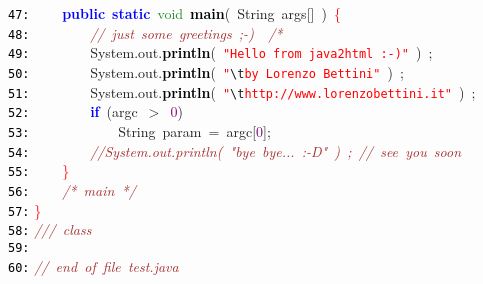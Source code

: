 \documentclass{article}
\begin{document}
\mbox{}\texttt{\textcolor{Black}{47:}} \ \ \ \ \textbf{\textcolor{Blue}{public}}\ \textbf{\textcolor{Blue}{static}}\ \textcolor{ForestGreen}{void}\ \textbf{\textcolor{Black}{main}}\textcolor{BrickRed}{(}\ \textcolor{TealBlue}{String}\ args\textcolor{BrickRed}{[]}\ \textcolor{BrickRed}{)}\ \textcolor{Red}{\{} \\
\mbox{}\texttt{\textcolor{Black}{48:}} \ \ \ \ \ \ \ \ \textit{\textcolor{Brown}{//\ just\ some\ greetings\ ;-)\ \ /*}} \\
\mbox{}\texttt{\textcolor{Black}{49:}} \ \ \ \ \ \ \ \ System\textcolor{BrickRed}{.}out\textcolor{BrickRed}{.}\textbf{\textcolor{Black}{println}}\textcolor{BrickRed}{(}\ \texttt{\textcolor{Red}{"{}Hello\ from\ java2html\ :-)"{}}}\ \textcolor{BrickRed}{)}\ \textcolor{BrickRed}{;} \\
\mbox{}\texttt{\textcolor{Black}{50:}} \ \ \ \ \ \ \ \ System\textcolor{BrickRed}{.}out\textcolor{BrickRed}{.}\textbf{\textcolor{Black}{println}}\textcolor{BrickRed}{(}\ \texttt{\textcolor{Red}{"{}}}\texttt{\textcolor{CarnationPink}{\textbackslash{}t}}\texttt{\textcolor{Red}{by\ Lorenzo\ Bettini"{}}}\ \textcolor{BrickRed}{)}\ \textcolor{BrickRed}{;} \\
\mbox{}\texttt{\textcolor{Black}{51:}} \ \ \ \ \ \ \ \ System\textcolor{BrickRed}{.}out\textcolor{BrickRed}{.}\textbf{\textcolor{Black}{println}}\textcolor{BrickRed}{(}\ \texttt{\textcolor{Red}{"{}}}\texttt{\textcolor{CarnationPink}{\textbackslash{}t}}\texttt{\textcolor{Red}{http://www.lorenzobettini.it"{}}}\ \textcolor{BrickRed}{)}\ \textcolor{BrickRed}{;} \\
\mbox{}\texttt{\textcolor{Black}{52:}} \ \ \ \ \ \ \ \ \textbf{\textcolor{Blue}{if}}\ \textcolor{BrickRed}{(}argc\ \textcolor{BrickRed}{$>$}\ \textcolor{Purple}{0}\textcolor{BrickRed}{)} \\
\mbox{}\texttt{\textcolor{Black}{53:}} \ \ \ \ \ \ \ \ \ \ \ \ \textcolor{TealBlue}{String}\ param\ \textcolor{BrickRed}{=}\ argc\textcolor{BrickRed}{[}\textcolor{Purple}{0}\textcolor{BrickRed}{];} \\
\mbox{}\texttt{\textcolor{Black}{54:}} \ \ \ \ \ \ \ \ \textit{\textcolor{Brown}{//System.out.println(\ "{}bye\ bye...\ :-D"{}\ )\ ;\ //\ see\ you\ soon}} \\
\mbox{}\texttt{\textcolor{Black}{55:}} \ \ \ \ \textcolor{Red}{\}} \\
\mbox{}\texttt{\textcolor{Black}{56:}} \ \ \ \ \textit{\textcolor{Brown}{/*\ main\ */}} \\
\mbox{}\texttt{\textcolor{Black}{57:}} \textcolor{Red}{\}} \\
\mbox{}\texttt{\textcolor{Black}{58:}} \textit{\textcolor{Brown}{///\ class}} \\
\mbox{}\texttt{\textcolor{Black}{59:}}  \\
\mbox{}\texttt{\textcolor{Black}{60:}} \textit{\textcolor{Brown}{//\ end\ of\ file\ test.java}}
\end{document}
